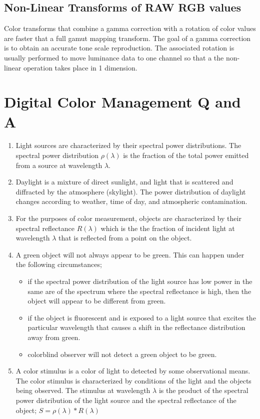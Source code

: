 \subsection{Non-Linear Transforms of RAW RGB values}
Color transforms that combine a gamma correction with a rotation of color values are faster that a full gamut mapping transform. The goal of a gamma correction is to obtain an accurate tone scale reproduction.  The associated rotation is usually performed to move luminance data to one channel so that a the non-linear operation takes place in 1 dimension.


\section{Digital Color Management Q and A}
 \begin{enumerate}
 \item
 Light sources are characterized by their spectral power distributions.  The spectral power distribution $\rho(\lambda)$ is the fraction of the total power emitted from a source at wavelength $\lambda$.
 \item
 Daylight is a mixture of direct sunlight, and light that is scattered and diffracted by the atmosphere (skylight).  The power distribution of daylight changes according to weather, time of day, and atmospheric contamination.
 \item
 For the purposes of color measurement, objects are characterized by their spectral reflectance $R(\lambda)$ which is the the fraction of incident light at wavelength $\lambda$ that is reflected from a point on the object.
 \item
 A green object will not always appear to be green.  This can happen under the following circumstances; \begin{itemize}
 \item
 if the spectral power distribution of the light source has low power in the same are of the spectrum where the spectral reflectance is high, then the object will appear to be different from green.
 \item
 if the object is fluorescent and is exposed to a light source that excites the particular wavelength that causes a shift in the reflectance distribution away from green.
 \item
 colorblind observer will not detect a green object to be green.\end{itemize}
 \item
 A color stimulus is a color of light to detected by some observational means.  The color stimulus is characterized by conditions of the light and the objects being observed.  The stimulus at wavelength $\lambda$ is the product of the spectral power distribution of the light source and the spectral reflectance of the object; $S=\rho(\lambda)*R(\lambda)$

\end{enumerate}
